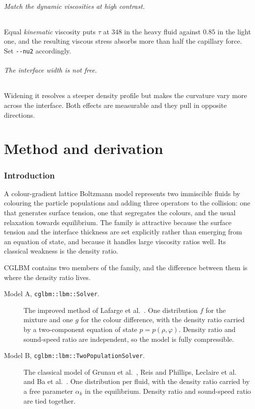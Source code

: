 \documentclass[11pt,a4paper]{article}
\theoremstyle{plain}
\theoremstyle{definition}
\begin{document}
\paragraph{Match the dynamic viscosities at high contrast.} Equal
\emph{kinematic} viscosity puts $\tau$ at $348$ in the heavy fluid against
$0.85$ in the light one, and the resulting viscous stress absorbs more than half
the capillary force. Set \texttt{-{-}nu2} accordingly.

\paragraph{The interface width is not free.} Widening it resolves a steeper
density profile but makes the curvature vary more across the interface. Both
effects are measurable and they pull in opposite directions.

\part{Method and derivation}
\label{part:method}

\section{Introduction}

A colour-gradient lattice Boltzmann model represents two immiscible fluids by
colouring the particle populations and adding three operators to the collision:
one that generates surface tension, one that segregates the colours, and the
usual relaxation towards equilibrium. The family is attractive because the
surface tension and the interface thickness are set explicitly rather than
emerging from an equation of state, and because it handles large viscosity
ratios well. Its classical weakness is the density ratio.

CGLBM contains two members of the family, and the difference between them is
where the density ratio lives.

\begin{description}
\item[Model A, \texttt{cglbm::lbm::Solver}.] The improved method of Lafarge et
al.~\cite{lafarge2021}. One distribution $f$ for the mixture and one $g$ for the
colour difference, with the density ratio carried by a two-component equation of
state $p = p(\rho,\varphi)$. Density ratio and sound-speed ratio are
independent, so the model is fully compressible.
\item[Model B, \texttt{cglbm::lbm::TwoPopulationSolver}.] The classical model of
Grunau et al.~\cite{grunau1993}, Reis and Phillips, Leclaire et
al.~\cite{leclaire2011,leclaire2012} and Ba et al.~\cite{ba2016}. One
distribution per fluid, with the density ratio carried by a free parameter
$\alpha_k$ in the equilibrium. Density ratio and sound-speed ratio are tied
together.
\end{description}
\end{document}
